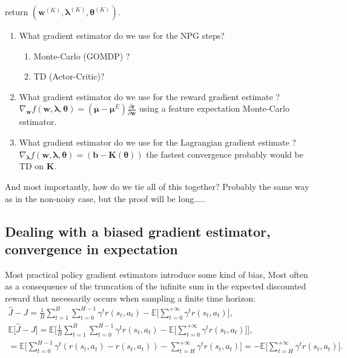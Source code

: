 \begin{algorithm}
      return $(\bm{w}^{(K)},\bm{\lambda}^{(K)},\bm{\theta}^{(K)})$.
  \end{algorithm}

  \begin{enumerate}
    \item What gradient estimator do we use for the NPG steps?
    \begin{enumerate}
        \item Monte-Carlo (GOMDP) ?
        \item TD (Actor-Critic)?
    \end{enumerate}
    \item What gradient estimator do we use for the reward gradient estimate ?  $\nabla_{\bm{w}} f(\bm{w},\bm{\lambda},{\bm{\theta}}) = (\bm{\mu}-\bm{\mu}^E) \frac{\partial \bm{r}}{\partial \bm{w}}$ using a feature expectation Monte-Carlo estimator.
    \item What gradient estimator do we use for the Lagrangian gradient estimate ?  $\nabla_{\bm{\lambda}} f(\bm{w},\bm{\lambda},{\bm{\theta}}) =  (\bm{b}-\bm{K}(\bm{\theta}))$ the fastest convergence probably would be TD on $\bm{K}$.
  \end{enumerate}

  And most importantly, how do we tie all of this together? Probably the same way as in the non-noisy case, but the proof will be long.....


\subsection{Dealing with a biased gradient estimator, convergence in expectation}

Most practical policy gradient estimators introduce some kind of bias, Most often as a consequence of the truncation of the infinite sum in the expected discounted reward that necessarily occurs when sampling a finite time horizon:
\begin{align*}
    \hat{J} - J =  
    \frac{1}{B}
        \sum_{t=1}^{B}  
        \sum_{t=0}^{H-1}  
        \gamma^t r(s_t,a_t) -
        \mathbb{E}\Bigg[
        \sum_{t=0}^{+\infty}  
        \gamma^t r(s_t,a_t)
    \Bigg] ,\\
    \mathbb{E}\big[\hat{J}-J\big] = \mathbb{E}\Bigg[ 
        \frac{1}{B}
         \sum_{t=1}^{B}  
        \sum_{t=0}^{H-1}  
        \gamma^t r(s_t,a_t) -
            \mathbb{E}\Big[
                \sum_{t=0}^{+\infty}  
                \gamma^t r(s_t,a_t)
            \Big]
        \Bigg],  \\
    =\mathbb{E}\Bigg[ 
        \sum_{t=0}^{H-1}  
        \gamma^t (r(s_t,a_t) - r(s_t,a_t) )
        -
        \sum_{t=H}^{+\infty}  
        \gamma^t r(s_t,a_t)
        \Bigg] 
        =
        -
        \mathbb{E}\Bigg[ 
        \sum_{t=H}^{+\infty}  
        \gamma^t r(s_t,a_t)
        \Bigg].
\end{align*}

